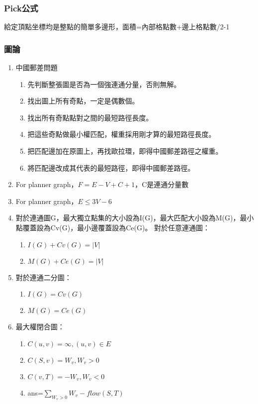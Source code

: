 \subsubsection{Pick公式}
給定頂點坐標均是整點的簡單多邊形，面積=內部格點數+邊上格點數/2-1

\subsubsection{圖論}

\begin{enumerate}\itemsep = -5pt
\item 中國郵差問題
	\begin{enumerate} \itemsep = -3pt
	\item 先判斷整張圖是否為一個強連通分量，否則無解。
	\item 找出圖上所有奇點，一定是偶數個。
	\item 找出所有奇點點對之間的最短路徑長度。
	\item 把這些奇點做最小權匹配，權重採用剛才算的最短路徑長度。
	\item 把匹配邊加在原圖上，再找歐拉環，即得中國郵差路徑之權重。
	\item 將匹配邊改成其代表的最短路徑，即得中國郵差路徑。
	\end{enumerate}
\item For planner graph，$F=E-V+C+1$，C是連通分量數
\item For planner graph，$E\leq 3V-6$
\item 對於連通圖G，最大獨立點集的大小設為I(G)，最大匹配大小設為M(G)，最小點覆蓋設為Cv(G)，最小邊覆蓋設為Ce(G)。
對於任意連通圖：
	\begin{enumerate}\itemsep = -3pt
	\item $I(G)+Cv(G)=|V|$
	\item $M(G)+Ce(G)=|V|$
	\end{enumerate}
\item 對於連通二分圖：
	\begin{enumerate}\itemsep = -3pt
	\item $I(G)=Cv(G)$
	\item $M(G)=Ce(G)$
	\end{enumerate}
\item 最大權閉合圖：
	\begin{enumerate}\itemsep = -3pt
	\item $C(u,v)=\infty ,(u,v)\in E$
	\item $C(S,v)=W_v ,W_v>0$
	\item $C(v,T)=-W_v ,W_v<0$
	\item ans=$\sum_{W_v>0} W_v-flow(S,T)$

\end{enumerate}
\end{enumerate}
